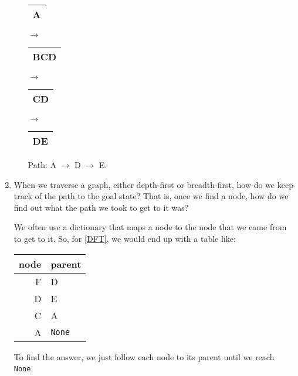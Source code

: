 \documentclass[11pt]{article}
\newenvironment{answer}{\large\lstset{basicstyle=\large}\color{white}}{}
\newenvironment{answer}{\large\lstset{basicstyle=\large}\color{red}}{}
\begin{document}
\begin{enumerate}
\begin{enumerate}
                \begin{answer}
                \begin{tabular}{c}
                \hline
                A\\\hline
                \end{tabular}
                $\rightarrow$
                \begin{tabular}{c}
                \hline
                BCD\\\hline
                \end{tabular}
                $\rightarrow$
                \begin{tabular}{c}
                \hline
                CD\\\hline
                \end{tabular}
                $\rightarrow$
                \begin{tabular}{c}
                \hline
                DE\\\hline
                \end{tabular}

                Path: A $\rightarrow$ D $\rightarrow$ E.
                \end{answer}

        \end{enumerate}

    \item When we traverse a graph, either depth-first or breadth-first, how do
        we keep track of the path to the goal state? That is, once we find a
        node, how do we find out what the path we took to get to it was?

        \begin{answer}
        We often use a dictionary that maps a node to the node that we came
        from to get to it. So, for \ref{DFT}, we would end up with a table like:
        \begin{tabular}{r|l}
        node & parent\\\hline
        F & D\\
        D & E\\
        C & A\\
        A & {\tt None}
        \end{tabular}

        To find the answer, we just follow each node to its parent until we
        reach {\tt None}.
        \end{answer}


\end{enumerate}
\end{document}
